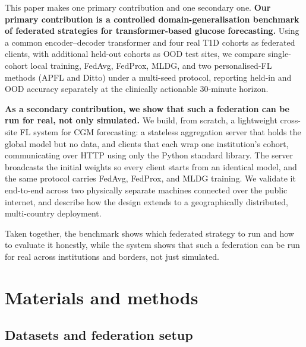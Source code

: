 \documentclass[10pt,letterpaper]{article}
\begin{document}
This paper makes one primary contribution and one secondary one. \textbf{Our
primary contribution is a controlled domain-generalisation benchmark of federated
strategies for transformer-based glucose forecasting.} Using a common
encoder--decoder transformer and four real T1D cohorts as federated clients, with
additional held-out cohorts as OOD test sites, we compare single-cohort local
training, FedAvg, FedProx, MLDG, and two personalised-FL methods (APFL and Ditto)
under a multi-seed protocol, reporting held-in and OOD accuracy separately at the
clinically actionable 30-minute horizon.

\textbf{As a secondary contribution, we show that such a federation can be run for
real, not only simulated.} We build, from scratch, a lightweight cross-site FL
system for CGM forecasting: a stateless aggregation server that holds the global
model but no data, and clients that each wrap one institution's cohort,
communicating over HTTP using only the Python standard library. The server
broadcasts the initial weights so every client starts from an identical model, and
the same protocol carries FedAvg, FedProx, and MLDG training. We validate it
end-to-end across two physically separate machines connected over the public
internet, and describe how the design extends to a geographically distributed,
multi-country deployment.

Taken together, the benchmark shows which federated strategy to run and how to
evaluate it honestly, while the system shows that such a federation can be run for
real across institutions and borders, not just simulated.

\section*{Materials and methods}

\subsection*{Datasets and federation setup}
\end{document}
